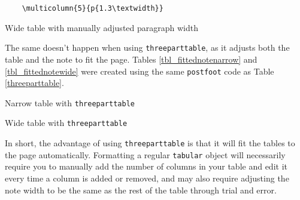 \documentclass[11pt,a4paper]{article}
\begin{document}
\begin{verbatim}
	\multicolumn{5}{p{1.3\textwidth}}
\end{verbatim}

\begin{table}[H]
	\caption{Wide table with manually adjusted paragraph width}
	\label{tbl_widenote}
	\begin{adjustbox}{max width = \textwidth}
		
	\end{adjustbox}
\end{table}
 
The same doesn't happen when using \texttt{threeparttable}, as it adjusts both the table and the note to fit the page. Tables \ref{tbl_fittednotenarrow} and \ref{tbl_fittednotewide} were created using the same \texttt{postfoot} code as Table \ref{threeparttable}. 
 
\begin{table}[H]
	\centering
	\caption{Narrow table with \texttt{threeparttable}}
	\label{tbl_fittednotenarrow}
	\begin{adjustbox}{max width = \textwidth}
	\begin{threeparttable}
		
	\end{threeparttable}
	\end{adjustbox}
\end{table}
 
\begin{table}[H]
	\caption{Wide table with \texttt{threeparttable}}
	\label{tbl_fittednotewide}
	\begin{adjustbox}{max width = \textwidth}
	\begin{threeparttable}
		
	\end{threeparttable}
	\end{adjustbox}
\end{table}

In short, the advantage of using \texttt{threeparttable} is that it will fit the tables to the page automatically. Formatting a regular \texttt{tabular} object will necessarily require you to manually add the number of columns in your table and edit it every time a column is added or removed, and may also require adjusting the note width to be the same as the rest of the table through trial and error.
 
\end{document}
